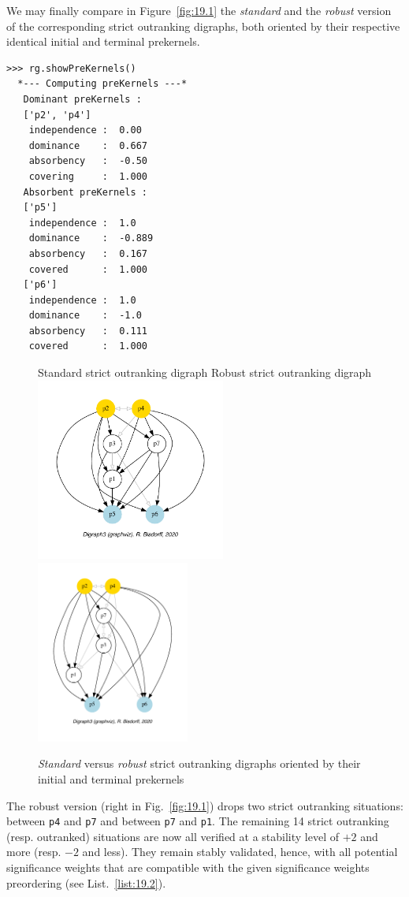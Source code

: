 We may finally compare in Figure~\vref{fig:19.1} the \emph{standard} and the \emph{robust} version of the corresponding strict outranking digraphs, both oriented by their respective identical initial and terminal prekernels.
\begin{lstlisting}
>>> rg.showPreKernels()
  *--- Computing preKernels ---*
   Dominant preKernels :
   ['p2', 'p4']
    independence :  0.00
    dominance    :  0.667
    absorbency   :  -0.50
    covering     :  1.000
   Absorbent preKernels :
   ['p5']
    independence :  1.0
    dominance    :  -0.889
    absorbency   :  0.167
    covered      :  1.000
   ['p6']
    independence :  1.0
    dominance    :  -1.0
    absorbency   :  0.111
    covered      :  1.000
\end{lstlisting}
\begin{figure}[ht]
  Standard strict outranking digraph \hfill Robust strict outranking digraph \\
  \includegraphics[height=6cm]{Figures/19-1-stdg.pdf}\hfill
  \includegraphics[height=6cm]{Figures/19-1-robg.pdf}
\caption{\emph{Standard} versus \emph{robust} strict outranking digraphs oriented by their initial and terminal prekernels} 
\label{fig:19.1}       %
\end{figure}
   
The robust version (right in Fig.~\vref{fig:19.1}) drops two strict outranking situations: between \texttt{p4} and \texttt{p7} and between \texttt{p7} and \texttt{p1}. The remaining 14 strict outranking (resp. outranked) situations are now all verified at a stability level of $+2$ and more (resp. $-2$ and less). They remain stably validated, hence, with all potential significance weights that are compatible with the given significance weights preordering (see List.~\vref{list:19.2}).

